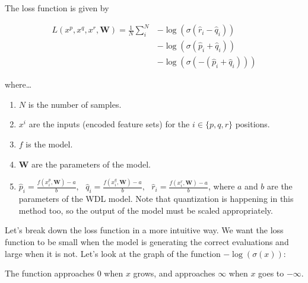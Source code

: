 The loss function is given by

\begin{align*}
L(x^p, x^q, x^r, \bm{W})=
\frac{1}{N}
\sum_i^N
& -\log\left(\sigma(\hat{r}_i - \hat{q}_i)\right) \\
& -\log\left(\sigma(\hat{p}_i + \hat{q}_i)\right) \\
& -\log\left(\sigma(-(\hat{p}_i + \hat{q}_i))\right)
\end{align*}

where\dots

\begin{enumerate}
\itemsep0em
\item $N$ is the number of samples.
\item $x^i$ are the inputs (encoded feature sets) for the $i \in \{p,q,r\}$ positions.
\item $f$ is the model.
\item $\bm{W}$ are the parameters of the model.
\item $
\hat{p}_i = \frac{f(x^p_i, \bm{W}) - a}{b},\text{ }
\hat{q}_i = \frac{f(x^q_i, \bm{W}) - a}{b},\text{ }
\hat{r}_i = \frac{f(x^r_i, \bm{W}) - a}{b}
$, where $a$ and $b$ are the parameters of the WDL model. Note that quantization is happening in this method too, so the output of the model must be scaled appropriately.
\end{enumerate}



Let's break down the loss function in a more intuitive way. We want the loss function to be small when the model is generating the correct evaluations and large when it is not. Let's look at the graph of the function $-\log(\sigma(x))$:

\begin{figure}[H]
\centering
{}
\end{figure}

The function approaches 0 when $x$ grows, and approaches $\infty$ when $x$ goes to $-\infty$.

